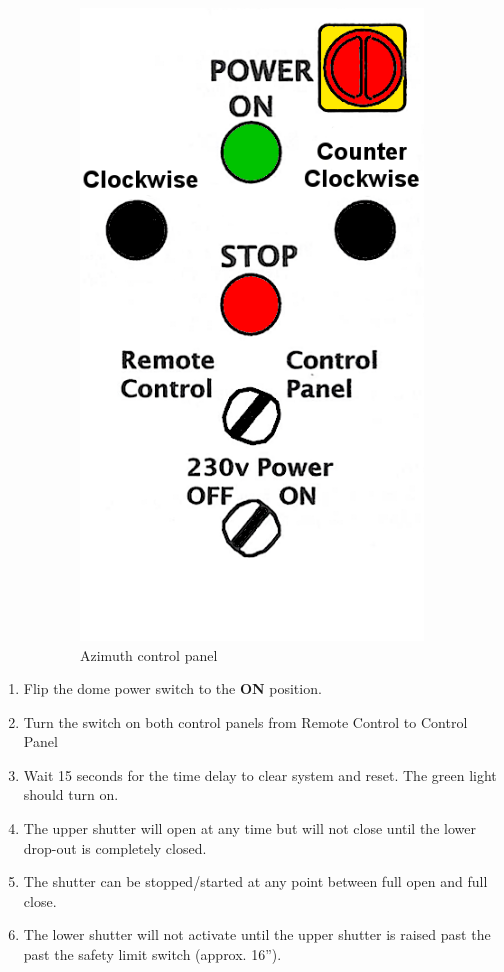 \documentclass[12pt,titlepage]{article}
\begin{document}
\begin{figure}[H]
\begin{subfigure}[t]{0.4\textwidth}
        \includegraphics[width=.8\textwidth]{./images/dome/azimuth_ctrl_panel.png}
        \caption{Azimuth control panel}
    \end{subfigure}
    \caption{}
\end{figure}

\begin{enumerate}
	\item Flip the dome power switch to the \textbf{ON} position.
	\item Turn the switch on both control panels from Remote Control to Control Panel
	\item Wait 15 seconds for the time delay to clear system and reset. The green light should turn on.
	\item The upper shutter will open at any time but will not close until the lower drop-out is completely closed.
	\item The shutter can be stopped/started at any point between full open and full close.
	\item The lower shutter will not activate until the upper shutter is raised past the past the safety limit switch (approx. 16'').
\end{enumerate}
\end{document}
